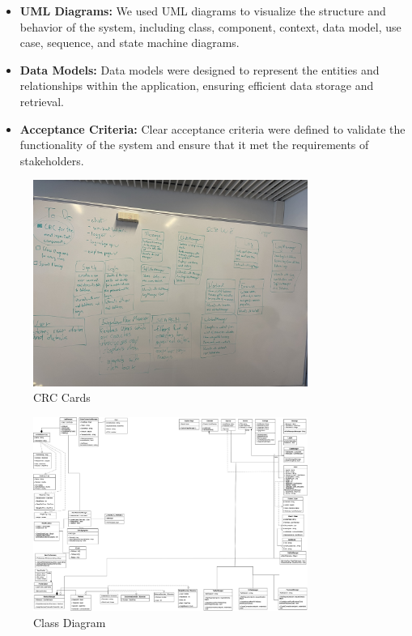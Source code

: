 \begin{itemize}
  \item \textbf{UML Diagrams:} We used UML diagrams to visualize the structure and behavior of the system, including class, component, context, data model, use case, sequence, and state machine diagrams.
  
  \item \textbf{Data Models:} Data models were designed to represent the entities and relationships within the application, ensuring efficient data storage and retrieval.
  
  \item \textbf{Acceptance Criteria:} Clear acceptance criteria were defined to validate the functionality of the system and ensure that it met the requirements of stakeholders.
\end{itemize}



\begin{figure}[H]
  \centering
  \includegraphics[width=0.8\textwidth]{images/crc_cards.jpg}
  \caption{CRC Cards}
  \label{fig:crcCards}
\end{figure}

\begin{figure}[H]
    \centering
    \includegraphics[width=0.8\textwidth]{images/class_diagram.png}
    \caption{Class Diagram}
    \label{fig:classDiagram}
\end{figure}

